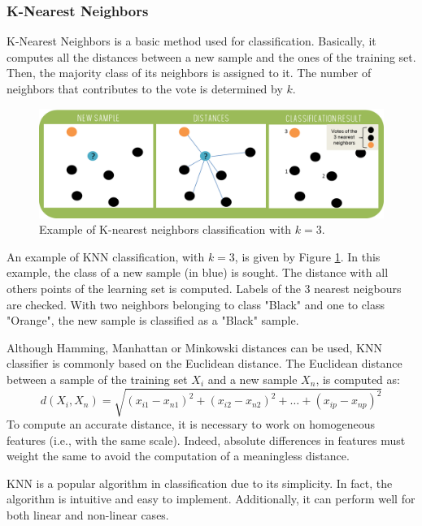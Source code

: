 \documentclass[a4paper,10pt]{article}
\begin{document}
\subsubsection{K-Nearest Neighbors}

K-Nearest Neighbors is a basic method used for classification. Basically, it computes all the distances between a new sample and the ones of the training set. Then, the majority class of its neighbors is assigned to it. The number of neighbors that contributes to the vote is determined by $k$.

\begin{figure}[htbp]
\centerline{\includegraphics[width=\linewidth]{./figures/KNNIlustration.png}}
\caption{Example of K-nearest neighbors classification with $k=3$.}
\label{KNNEx}
\end{figure}

An example of KNN classification, with $k=3$, is given by Figure \ref{KNNEx}. In this example, the class of a new sample (in blue) is sought. The distance with all others points of the learning set is computed. Labels of the 3 nearest neigbours are checked. With two neighbors belonging to class "Black" and one to class "Orange", the new sample is classified as a "Black" sample.

Although Hamming, Manhattan or Minkowski distances can be used, KNN classifier is commonly based on the Euclidean distance.
The Euclidean distance between a sample of the training set $X_{i}$ and a new sample $X_{n}$, is computed as:
\begin{equation}
d(X_{i},X_{n}) = \sqrt{(x_{i1}-x_{n1})^2+(x_{i2}-x_{n2})^2+\ldots+(x_{ip}-x_{np})^2}
\end{equation}
To compute an accurate distance, it is necessary to work on homogeneous features (i.e., with the same scale). Indeed, absolute differences in features must weight the same to avoid the computation of a meaningless distance.

KNN is a popular algorithm in classification due to its simplicity. In fact, the algorithm is intuitive and easy to implement. Additionally, it can perform well for both linear and non-linear cases. 
\end{document}
